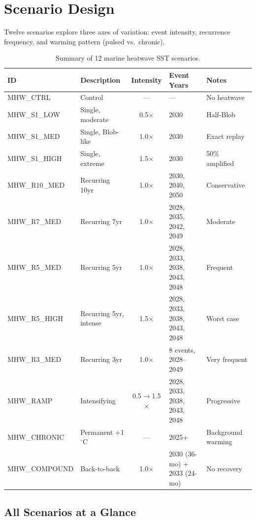 \documentclass[11pt,a4paper]{article}
\begin{document}
\section{Scenario Design}

Twelve scenarios explore three axes of variation: event intensity, recurrence frequency, and warming pattern (pulsed vs.\ chronic).

\begin{table}[H]
\centering
\small
\begin{tabular}{llcll}
\toprule
\textbf{ID} & \textbf{Description} & \textbf{Intensity} & \textbf{Event Years} & \textbf{Notes} \\
\midrule
MHW\_CTRL & Control & --- & --- & No heatwave \\
MHW\_S1\_LOW & Single, moderate & 0.5$\times$ & 2030 & Half-Blob \\
MHW\_S1\_MED & Single, Blob-like & 1.0$\times$ & 2030 & Exact replay \\
MHW\_S1\_HIGH & Single, extreme & 1.5$\times$ & 2030 & 50\% amplified \\
\midrule
MHW\_R10\_MED & Recurring 10yr & 1.0$\times$ & 2030, 2040, 2050 & Conservative \\
MHW\_R7\_MED & Recurring 7yr & 1.0$\times$ & 2028, 2035, 2042, 2049 & Moderate \\
MHW\_R5\_MED & Recurring 5yr & 1.0$\times$ & 2028, 2033, 2038, 2043, 2048 & Frequent \\
MHW\_R5\_HIGH & Recurring 5yr, intense & 1.5$\times$ & 2028, 2033, 2038, 2043, 2048 & Worst case \\
MHW\_R3\_MED & Recurring 3yr & 1.0$\times$ & 8 events, 2028--2049 & Very frequent \\
\midrule
MHW\_RAMP & Intensifying & 0.5$\rightarrow$1.5$\times$ & 2028, 2033, 2038, 2043, 2048 & Progressive \\
MHW\_CHRONIC & Permanent +1$^\circ$C & --- & 2025+ & Background warming \\
MHW\_COMPOUND & Back-to-back & 1.0$\times$ & 2030 (36-mo) + 2033 (24-mo) & No recovery \\
\bottomrule
\end{tabular}
\caption{Summary of 12 marine heatwave SST scenarios.}
\label{tab:scenarios}
\end{table}

\subsection{All Scenarios at a Glance}
\end{document}
